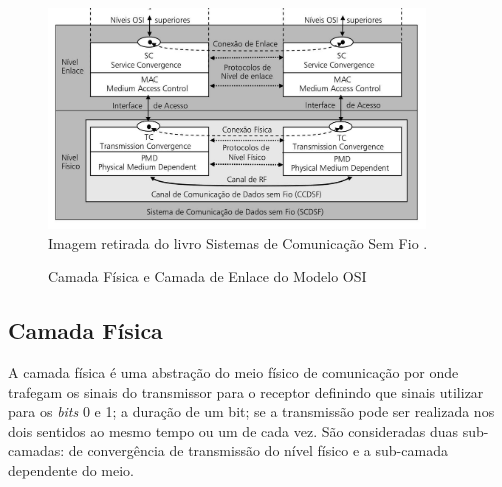 \begin{figure}[ht]
      \begin{center}
            \caption{Camada Física e Camada de Enlace do Modelo OSI}
            \includegraphics[width=10cm]{./sections/textual/chapters/images/modelo_osi_1e2.png}\\
            Imagem retirada do livro Sistemas de Comunicação Sem Fio \cite{rochol2018sistemas}.
            \label{fig:modelo_osi_1e2}
      \end{center}
\end{figure}


\subsection{Camada Física}
A camada física é uma abstração do meio físico de comunicação por onde trafegam os sinais do transmissor para o receptor definindo que sinais utilizar para os \emph{bits} 0 e 1; a duração de um bit; se a transmissão pode ser realizada nos dois sentidos ao mesmo tempo ou um de cada vez. São consideradas duas sub-camadas: de convergência de transmissão do nível físico e a sub-camada dependente do meio.

